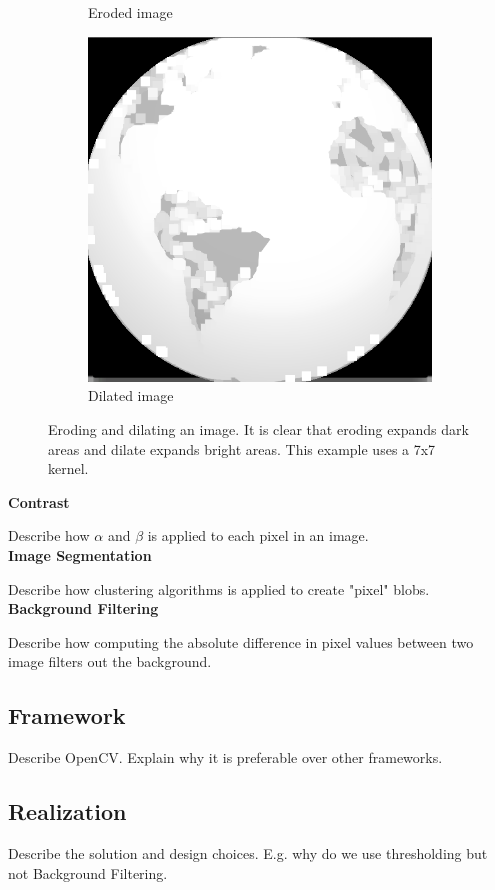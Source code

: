 \begin{figure}[!ht]
\begin{subfigure}[b]{0.3\textwidth}
                \caption{Eroded image}
        \end{subfigure}
		\quad
        \begin{subfigure}[b]{0.3\textwidth}
                \includegraphics[scale = 0.2]{img/dilate}
                \caption{Dilated image}
        \end{subfigure}
		\caption{Eroding and dilating an image. It is clear that eroding expands dark areas and dilate expands bright areas. This example uses a 7x7 kernel.}
		\label{fig:erodedilate}
\end{figure}

\newpage

\noindent \textbf{Contrast} \par
Describe how $\alpha$ and $\beta$ is applied to each pixel in an image. \\

\noindent \textbf{Image Segmentation} \par
Describe how clustering algorithms is applied to create "pixel" blobs. \\

\noindent \textbf{Background Filtering} \par
Describe how computing the absolute difference in pixel values between two image filters out the background. \\

\subsection{Framework}
Describe OpenCV. Explain why it is preferable over other frameworks. \\

\subsection{Realization}
Describe the solution and design choices. E.g. why do we use thresholding but not Background Filtering. \\


